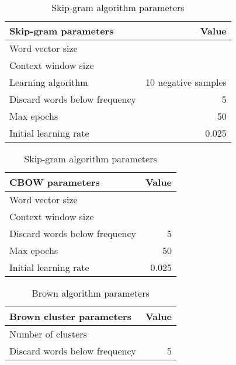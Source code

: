 \begin{table}
\centering
\begin{small}
\begin{tabular}{lr}
\hline
\textbf{Skip-gram parameters}  & \textbf{Value} \\ \hline
Word vector size &  \\
Context window size & \\
Learning algorithm &10 negative samples \\
Discard words below frequency & 5 \\
Max epochs & 50 \\
Initial learning rate & 0.025 \\ \hline
\end{tabular}
\label{skip}
\caption{Skip-gram algorithm parameters}
\end{small}
\end{table}

\begin{table}
\centering
\begin{small}
\begin{tabular}{lr}
\hline
\textbf{CBOW parameters}  & \textbf{Value} \\ \hline
Word vector size &  \\
Context window size & \\
Discard words below frequency & 5 \\
Max epochs & 50 \\
Initial learning rate & 0.025 \\ \hline
\end{tabular}
\label{cbow}
\caption{Skip-gram algorithm parameters}
\end{small}
\end{table}


\begin{table}
\centering
\begin{small}
\begin{tabular}{lr}
\hline
\textbf{Brown cluster parameters}  & \textbf{Value} \\ \hline
Number of clusters & \\ 
Discard words below frequency & 5 \\ \hline
\end{tabular}
\label{brown}
\caption{Brown algorithm parameters}
\end{small}
\end{table}


